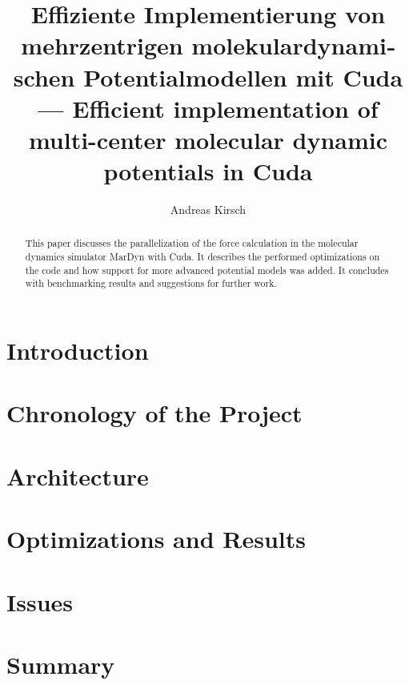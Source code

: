 \documentclass[11pt,a4paper,onecolumn,notitlepage]{elsarticle}
\author{Andreas Kirsch}
\title{\foreignlanguage{ngerman}{Effiziente Implementierung von mehrzentrigen molekulardynamischen Potentialmodellen mit Cuda} \linebreak --- Efficient implementation of multi-center molecular dynamic potentials in Cuda}
\newcommand{\cuda}{Cuda}
\begin{document}
\begin{abstract}
This paper discusses the parallelization of the force calculation in the molecular dynamics simulator MarDyn with \cuda. It describes the performed optimizations on the code and how support for more advanced potential models was added. It concludes with benchmarking results and suggestions for further work.
\end{abstract}

\maketitle

\section{Introduction}



\section{Chronology of the Project}

\section{Architecture}

\section{Optimizations and Results}

\section{Issues}

\section{Summary}
\end{document}
